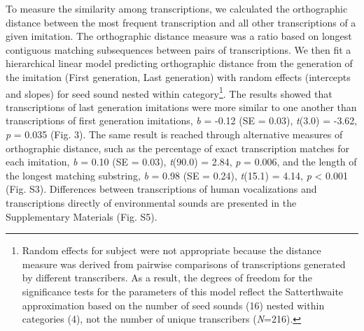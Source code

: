 \documentclass[english,floatsintext,man]{apa6}
\theoremstyle{definition}
\theoremstyle{definition}
\theoremstyle{remark}
\begin{document}
To measure the similarity among transcriptions, we calculated the
orthographic distance between the most frequent transcription and all
other transcriptions of a given imitation. The orthographic distance
measure was a ratio based on longest contiguous matching subsequences
between pairs of transcriptions. We then fit a hierarchical linear model
predicting orthographic distance from the generation of the imitation
(First generation, Last generation) with random effects (intercepts and
slopes) for seed sound nested within category\footnote{Random effects
  for subject were not appropriate because the distance measure was
  derived from pairwise comparisons of transcriptions generated by
  different transcribers. As a result, the degrees of freedom for the
  significance tests for the parameters of this model reflect the
  Satterthwaite approximation based on the number of seed sounds (16)
  nested within categories (4), not the number of unique transcribers
  (\emph{N}=216).}. The results showed that transcriptions of last
generation imitations were more similar to one another than
transcriptions of first generation imitations, \emph{b} = -0.12 (SE =
0.03), \emph{t}(3.0) = -3.62, \emph{p} = 0.035 (Fig. 3). The same result
is reached through alternative measures of orthographic distance, such
as the percentage of exact transcription matches for each imitation,
\emph{b} = 0.10 (SE = 0.03), \emph{t}(90.0) = 2.84, \emph{p} = 0.006,
and the length of the longest matching substring, \emph{b} = 0.98 (SE =
0.24), \emph{t}(15.1) = 4.14, \emph{p} \textless{} 0.001 (Fig. S3).
Differences between transcriptions of human vocalizations and
transcriptions directly of environmental sounds are presented in the
Supplementary Materials (Fig. S5).
\end{document}
